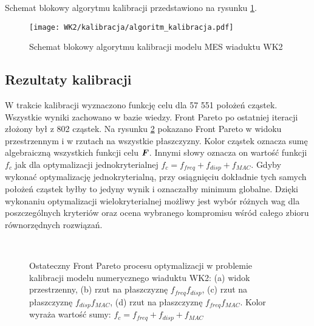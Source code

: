 Schemat blokowy algorytmu kalibracji przedstawiono na rysunku \ref{fig:kalibracja_algoritm}. 

\begin{figure}[p]
	\centering
	\texttt{[image: WK2/kalibracja/algoritm\_kalibracja.pdf]}
	\captionsetup{justification=centering}
	\caption{Schemat blokowy algorytmu kalibracji modelu MES wiaduktu WK2}
	\label{fig:kalibracja_algoritm}
\end{figure}


\subsection{Rezultaty kalibracji}
W trakcie kalibracji wyznaczono funkcję celu dla 57 551 położeń cząstek. Wszystkie wyniki zachowano w bazie wiedzy. Front Pareto po ostatniej iteracji złożony był z 802 cząstek. Na rysunku \ref{fig: calibration_pareto} pokazano Front Pareto w widoku przestrzennym i w rzutach na wszystkie płaszczyzny. Kolor cząstek oznacza sumę algebraiczną wszystkich funkcji celu $\bm{F}$. Innymi słowy oznacza on wartość funkcji $f_c$ jak dla optymalizacji jednokryterialnej $f_c = f_{freq}+f_{disp}+f_{MAC}$. Gdyby wykonać optymalizację jednokryterialną, przy osiągnięciu dokładnie tych samych położeń cząstek byłby to jedyny wynik i oznaczałby minimum globalne. Dzięki wykonaniu optymalizacji wielokryterialnej możliwy jest wybór różnych wag dla poszczególnych kryteriów oraz ocena wybranego kompromisu wśród całego zbioru równorzędnych rozwiązań.

\begin{figure}[h]
	\centering
	 \\
	\captionsetup{justification=centering}
	\caption{Ostateczny Front Pareto procesu optymalizacji w problemie kalibracji modelu numerycznego wiaduktu WK2: (a) widok przestrzenny, (b) rzut na płaszczyznę $f_{freq}f_{disp}$, (c) rzut na płaszczyznę $f_{disp}f_{MAC}$, (d) rzut na płaszczyznę $f_{freq}f_{MAC}$. Kolor wyraża wartość sumy: $f_c = f_{freq}+f_{disp}+f_{MAC}$ }
	\label{fig: calibration_pareto}
\end{figure}

